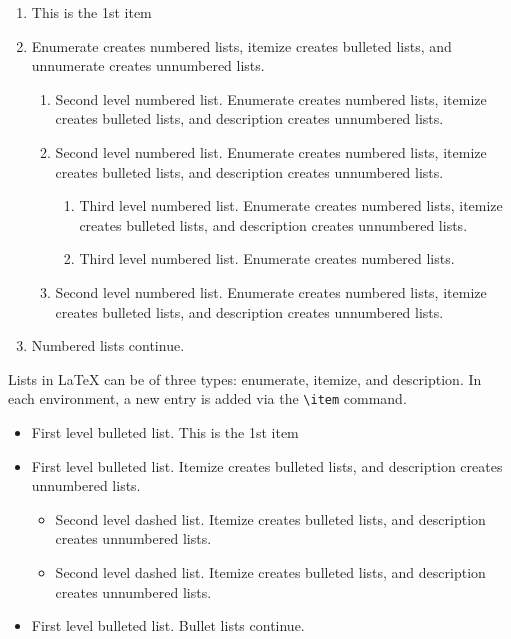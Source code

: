 \documentclass[12pt,a4paper]{article}
\begin{document}
\begin{enumerate}[label=\arabic*.]
\item This is the 1st item
\item Enumerate creates numbered lists, itemize creates bulleted lists, and unnumerate creates unnumbered lists.

\begin{enumerate}[label=\alph*.]
\item Second level numbered list. Enumerate creates numbered lists, itemize creates bulleted lists, and description creates unnumbered lists.
\item Second level numbered list. Enumerate creates numbered lists, itemize creates bulleted lists, and description creates unnumbered lists.

\begin{enumerate}[label=(\roman*)]
\item Third level numbered list. Enumerate creates numbered lists, itemize creates bulleted lists, and description creates unnumbered lists.
\item Third level numbered list. Enumerate creates numbered lists.
\end{enumerate}

\item Second level numbered list. Enumerate creates numbered lists, itemize creates bulleted lists, and description creates unnumbered lists.
\end{enumerate}

\item Numbered lists continue.
\end{enumerate}
Lists in \LaTeX{} can be of three types: enumerate, itemize, and description.
In each environment, a new entry is added via the \verb+\item+ command.

\begin{itemize}
\item First level bulleted list. This is the 1st item
\item First level bulleted list. Itemize creates bulleted lists, and description creates unnumbered lists.

\begin{itemize}
\item Second level dashed list. Itemize creates bulleted lists, and description creates unnumbered lists.
\item Second level dashed list. Itemize creates bulleted lists, and description creates unnumbered lists.
\end{itemize}

\item First level bulleted list. Bullet lists continue.
\end{itemize}
\end{document}
